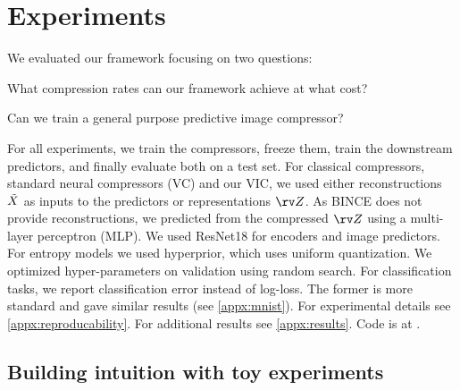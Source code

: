 \documentclass[final]{article}
\begin{document}
\section{Experiments}
\label{sec:experiments}
We evaluated our framework focusing on two questions:
\begin{inlinelist}
\item What compression rates can our framework achieve at what cost?
\item Can we train a general purpose predictive image compressor?
\end{inlinelist}
For all experiments, we train the compressors, freeze them, train the downstream predictors, and finally evaluate both on a test set.
For classical compressors, standard neural compressors (VC) and our VIC, we used either reconstructions $\Tilde{X}$ as inputs to the predictors or representations $\rv Z$.
As BINCE does not provide reconstructions, we predicted from the compressed $\rv Z$ using a multi-layer perceptron (MLP).
We used ResNet18 \cite{he_deep_2016} for encoders and image predictors.
For entropy models we used  hyperprior, which uses uniform quantization.
We optimized hyper-parameters on validation using random search.
For classification tasks, we report classification error instead of log-loss.
The former is more standard and gave similar results (see \cref{appx:mnist}).
For experimental details see \cref{appx:reproducability}. 
For additional results see \cref{appx:results}.
Code is at \codeurl{}.

\subsection{Building intuition with toy experiments}
\label{sec:toy_experiments}
\end{document}
